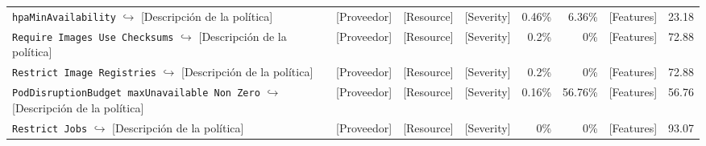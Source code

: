 \begin{table}[ht]
\begin{tabular}{lcccrrrr}
\makecell[l]{\texttt{hpaMinAvailability} \\ $\hookrightarrow$ [Descripción de la política]} & [Proveedor] & [Resource] & [Severity] & 0.46\% & 6.36\% & [Features] & 23.18 \\
\makecell[l]{\texttt{Require Images Use Checksums} \\ $\hookrightarrow$ [Descripción de la política]} & [Proveedor] & [Resource] & [Severity] & 0.2\% & 0\% & [Features] & 72.88 \\
\makecell[l]{\texttt{Restrict Image Registries} \\ $\hookrightarrow$ [Descripción de la política]} & [Proveedor] & [Resource] & [Severity] & 0.2\% & 0\% & [Features] & 72.88 \\
\makecell[l]{\texttt{PodDisruptionBudget maxUnavailable Non Zero} \\ $\hookrightarrow$ [Descripción de la política]} & [Proveedor] & [Resource] & [Severity] & 0.16\% & 56.76\% & [Features] & 56.76 \\
\makecell[l]{\texttt{Restrict Jobs} \\ $\hookrightarrow$ [Descripción de la política]} & [Proveedor] & [Resource] & [Severity] & 0\% & 0\% & [Features] & 93.07 \\
  \end{tabular}
\end{table}

